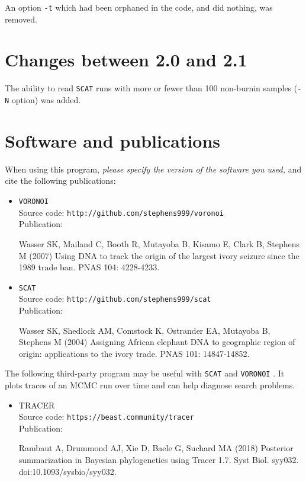 \documentclass[10pt,titlepage,times,letterpaper]{article}
\def\SCAT{{\tt SCAT} }
\def\VORONOI{{\tt VORONOI} }
\begin{document}
An option {\tt -t} which had been orphaned in the code, and did nothing, was removed.

\section{Changes between 2.0 and 2.1} \label{changes2_1}

The ability to read \SCAT runs with more or fewer than 100 non-burnin samples ({\tt -N} option)
was added.

\section{Software and publications}\label{software}

When using this program, {\it please specify the version of the software you used,} and
cite the following publications:

\begin{itemize}
\item \VORONOI \\
Source code: {\tt http://github.com/stephens999/voronoi} \\
Publication:

Wasser SK, Mailand C, Booth R, Mutayoba B, Kisamo E, Clark B, Stephens M (2007)
Using DNA to track the origin of the largest ivory seizure since the 1989 trade ban.
PNAS 104: 4228-4233.

\item \SCAT \\ 
Source code:  {\tt http://github.com/stephens999/scat} \\
Publication:

Wasser SK, Shedlock AM, Comstock K, Ostrander EA, Mutayoba B, Stephens M (2004)
Assigning African elephant DNA to geographic region of origin:  applications
to the ivory trade.  PNAS 101: 14847-14852.
\end{itemize}


The following third-party program may be useful with \SCAT and \VORONOI.  It
plots traces of an MCMC run over time and can help diagnose search problems.

\begin{itemize}
\item TRACER \\ 
Source code: {\tt https://beast.community/tracer } \\
Publication:

Rambaut A, Drummond AJ, Xie D, Baele G, Suchard MA (2018)  Posterior summarization in Bayesian
phylogenetics using Tracer 1.7.  Syst Biol.  syy032.  doi:10.1093/sysbio/syy032.
\end{itemize}
\end{document}
